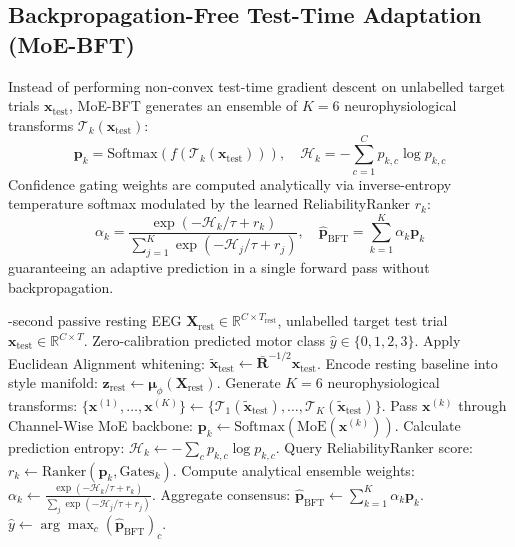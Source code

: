 \documentclass[journal,10pt]{IEEEtran}
\begin{document}
\subsection{Backpropagation-Free Test-Time Adaptation (MoE-BFT)}
Instead of performing non-convex test-time gradient descent on unlabelled target trials $\mathbf{x}_{\text{test}}$, MoE-BFT generates an ensemble of $K=6$ neurophysiological transforms $\mathcal{T}_k(\mathbf{x}_{\text{test}})$:
\begin{equation}
\mathbf{p}_k = \text{Softmax}(f(\mathcal{T}_k(\mathbf{x}_{\text{test}}))), \quad \mathcal{H}_k = -\sum_{c=1}^C p_{k,c} \log p_{k,c}
\end{equation}
Confidence gating weights are computed analytically via inverse-entropy temperature softmax modulated by the learned ReliabilityRanker $r_k$:
\begin{equation}
\alpha_k = \frac{\exp(-\mathcal{H}_k / \tau + r_k)}{\sum_{j=1}^K \exp(-\mathcal{H}_j / \tau + r_j)}, \quad \mathbf{\hat{p}}_{\text{BFT}} = \sum_{k=1}^K \alpha_k \mathbf{p}_k
\end{equation}
guaranteeing an adaptive prediction in a single forward pass without backpropagation.

\begin{algorithm}[t]
\caption{Zero-Calibration RS-LDM + MoE-BFT Inference}
\label{alg:rs_ldm_bft}
\begin{algorithmic}[1]
-second passive resting EEG $\mathbf{X}_{\text{rest}} \in \mathbb{R}^{C \times T_{\text{rest}}}$, unlabelled target test trial $\mathbf{x}_{\text{test}} \in \mathbb{R}^{C \times T}$.
\ENSURE Zero-calibration predicted motor class $\hat{y} \in \{0, 1, 2, 3\}$.
\STATE Apply Euclidean Alignment whitening: $\mathbf{\tilde{x}}_{\text{test}} \leftarrow \bar{\mathbf{R}}^{-1/2} \mathbf{x}_{\text{test}}$.
\STATE Encode resting baseline into style manifold: $\mathbf{z}_{\text{rest}} \leftarrow \mathbf{\mu}_\phi(\mathbf{X}_{\text{rest}})$.
\STATE Generate $K=6$ neurophysiological transforms:
$\{\mathbf{x}^{(1)}, \dots, \mathbf{x}^{(K)}\} \leftarrow \{\mathcal{T}_1(\mathbf{\tilde{x}}_{\text{test}}), \dots, \mathcal{T}_K(\mathbf{\tilde{x}}_{\text{test}})\}$.
    \STATE Pass $\mathbf{x}^{(k)}$ through Channel-Wise MoE backbone:
    $\mathbf{p}_k \leftarrow \text{Softmax}(\text{MoE}(\mathbf{x}^{(k)}))$.
    \STATE Calculate prediction entropy: $\mathcal{H}_k \leftarrow -\sum_c p_{k,c} \log p_{k,c}$.
    \STATE Query ReliabilityRanker score: $r_k \leftarrow \text{Ranker}(\mathbf{p}_k, \text{Gates}_k)$.
\ENDFOR
\STATE Compute analytical ensemble weights:
$\alpha_k \leftarrow \frac{\exp(-\mathcal{H}_k / \tau + r_k)}{\sum_j \exp(-\mathcal{H}_j / \tau + r_j)}$.
\STATE Aggregate consensus: $\mathbf{\hat{p}}_{\text{BFT}} \leftarrow \sum_{k=1}^K \alpha_k \mathbf{p}_k$.
\RETURN $\hat{y} \leftarrow \arg\max_c (\mathbf{\hat{p}}_{\text{BFT}})_c$.
\end{algorithmic}
\end{algorithm}
\end{document}
